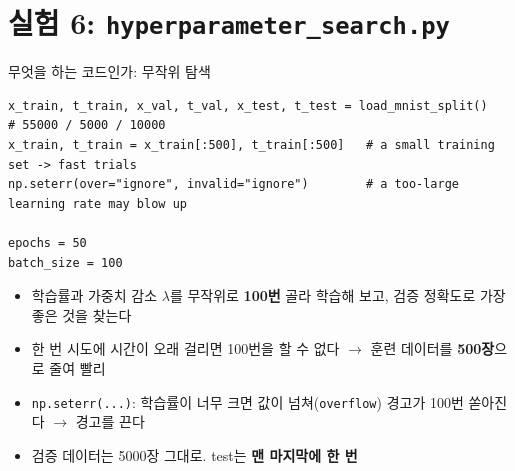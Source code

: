 \documentclass[aspectratio=169,11pt]{beamer}
\newcommand{\code}[1]{\texttt{#1}}
\begin{document}
\section{실험 6: \texttt{hyperparameter\_search.py}}

\begin{frame}[fragile]{무엇을 하는 코드인가: 무작위 탐색}
\begin{lstlisting}
x_train, t_train, x_val, t_val, x_test, t_test = load_mnist_split()   # 55000 / 5000 / 10000
x_train, t_train = x_train[:500], t_train[:500]   # a small training set -> fast trials
np.seterr(over="ignore", invalid="ignore")        # a too-large learning rate may blow up

epochs = 50
batch_size = 100
\end{lstlisting}
\begin{itemize}
\item 학습률과 가중치 감소 $\lambda$를 무작위로 \textbf{100번} 골라 학습해 보고, 검증 정확도로 가장 좋은 것을 찾는다
\item 한 번 시도에 시간이 오래 걸리면 100번을 할 수 없다 $\to$ 훈련 데이터를 \textbf{500장}으로 줄여 빨리
\item \code{np.seterr(...)}: 학습률이 너무 크면 값이 넘쳐(\code{overflow}) 경고가 100번 쏟아진다 $\to$ 경고를 끈다
\item 검증 데이터는 5000장 그대로. test는 \textbf{맨 마지막에 한 번}
\end{itemize}
\end{frame}
\end{document}
